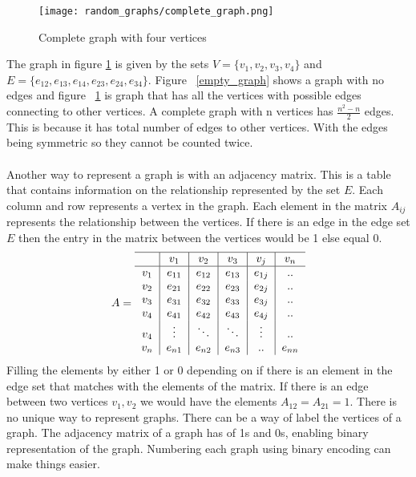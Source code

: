 \documentclass{Assignment}
\begin{document}
\begin{figure}[H]
	\centering
	\texttt{[image: random\_graphs/complete\_graph.png]}
	\caption{Complete graph with four vertices }
	\label{complete_graph}
\end{figure}
The graph in figure \ref{complete_graph} is given by the sets  $V = \{v_1, v_2, v_3, v_4\}$ and $E=\{e_{12},e_{13},e_{14},e_{23},e_{24},e_{34}\}.$ 
Figure ~\ref{empty_graph} shows a graph with no edges and figure ~\ref{complete_graph} is graph that has all the vertices with possible edges connecting to other vertices.
A complete graph with n vertices has ${\frac{n^2-n}{2}}$ edges.
This is because it has total number of edges to other vertices.
With the edges being symmetric so they cannot be counted twice.
\\\\
Another way to represent a graph is with an adjacency matrix.
This is a table that contains information on the relationship represented by the set $ E$.
Each column and row represents a vertex in the graph.
Each element in the matrix $A_{ij}$ represents the relationship between the vertices.
If there is an edge in the edge set $E$ then the entry in the matrix between the vertices would be 1 else equal 0.
\begin{equation}
	A=	\begin{tabular}{c|c|c|c|c|c}\hline
		&$v_1$&$v_2$&$v_3$&$v_j$&$v_n$\\\hline
		$v_1$&$e_{11}$&$e_{12}$&$e_{13}$&$e_{1j}$&..\\
		$v_2$&$e_{21}$&$e_{22}$&$e_{23}$&$e_{2j}$&..\\
		$v_3$&$e_{31}$&$e_{32}$&$e_{33}$&$e_{3j}$&..\\
		$v_4$&$e_{41}$&$e_{42}$&$e_{43}$&$e_{4j}$&..\\
		$v_4$&$\vdots$&$\ddots$&$\ddots$&$\vdots$&..\\
		$v_n$&$e_{n1}$&$e_{n2}$&$e_{n3}$&..&$e_{nn}$\\
	\end{tabular}
\end{equation}
Filling the elements by either 1 or 0 depending on if there is an element in the edge set that matches with the elements of the matrix.
If there is an edge between two vertices $v_1 ,v_2$ we would have the elements $A_{12} = A_{21}=1$. 
There is no unique way to represent graphs.
There can be a way of label the vertices of a graph.
The adjacency matrix of a graph has of 1s and 0s, enabling binary representation of the graph.
Numbering each graph using binary encoding can make things easier.
\end{document}

